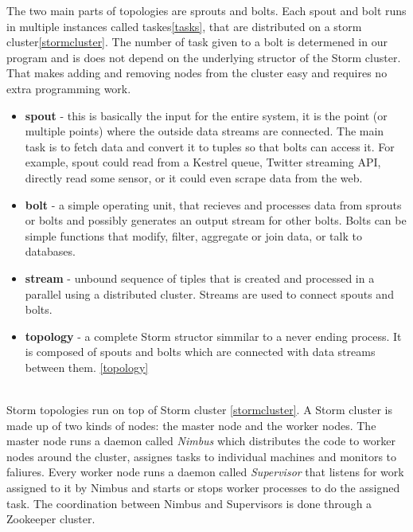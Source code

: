 \documentclass[journal]{IEEEtran/IEEEtran}
\begin{document}
The two main parts of topologies are sprouts and bolts. Each spout and bolt runs in multiple instances called taskes\ref{tasks}, that are distributed on a storm cluster\ref{stormcluster}. The number of task given to a bolt is determened in our program and is does not depend on the underlying structor of the Storm cluster. That makes adding and removing nodes from the cluster easy and requires no extra programming work. \\

\begin{itemize}
    \item \textbf{spout} - this is basically the input for the entire system, it is the point (or multiple points) where the outside data streams are connected. The main task is to fetch data and convert it to tuples so that bolts can access it. For example, spout could read from a Kestrel queue, Twitter streaming API, directly read some sensor, or it could even scrape data from the web.
    \item \textbf{bolt} - a simple operating unit, that recieves and processes data from sprouts or bolts and possibly generates an output stream for other bolts. Bolts can be simple functions that modify, filter, aggregate or join data, or talk to databases. 
    \item \textbf{stream} - unbound sequence of tiples that is created and processed in a parallel using a distributed cluster. Streams are used to connect spouts and bolts.
    \item \textbf{topology} - a complete Storm structor simmilar to a never ending process. It is composed of spouts and bolts which are connected with data streams between them. \ref{topology}
\end{itemize} 
\ \\

Storm topologies run on top of Storm cluster \ref{stormcluster}. A Storm cluster is made up of two kinds of nodes: the master node and the worker nodes. The master node runs a daemon called \textit{Nimbus} which distributes the code to worker nodes around the cluster, assignes tasks to individual machines and monitors to faliures. Every worker node runs a daemon called \textit{Supervisor} that listens for work assigned to it by Nimbus and starts or stops worker processes to do the assigned task. The coordination between Nimbus and Supervisors is done through a Zookeeper cluster.
\end{document}
